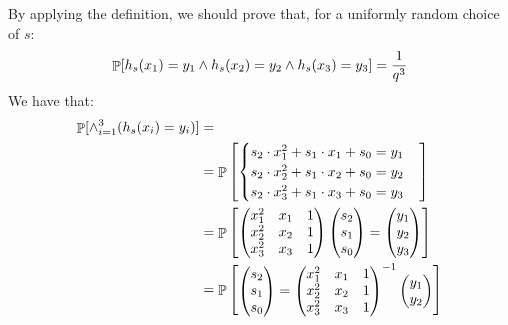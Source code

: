 \begin{enumerate}[(a)]
\begin{enumerate}[(i)]
		\begin{solution}		
			By applying the definition, we should prove that, for a uniformly random choice of $s$:
			\[ \mathop{\mathbb P}[h_s(x_1) = y_1 \wedge h_s(x_2) = y_2 \wedge h_s(x_3) = y_3] = \frac{1}{q^3} \]
			We have that:
			\begin{align*}
				\mathop{\mathbb P}[\wedge_{i=1}^3 (h_s(x_i) = y_i)] &= \\
				&=\mathop{\mathbb P}\begin{bmatrix}
						\begin{cases}
							s_2\cdot x_1^2 + s_1\cdot x_1 + s_0 = y_1 \\
							s_2\cdot x_2^2 + s_1\cdot x_2 + s_0 = y_2 \\
							s_2\cdot x_3^2 + s_1\cdot x_3 + s_0 = y_3
						\end{cases}
					\end{bmatrix} \\
				&= \mathop{\mathbb P}\begin{bmatrix}
					 	\begin{pmatrix}
							x_1^2 & x_1 & 1 \\
							x_2^2 & x_2 & 1 \\
							x_3^2 & x_3 & 1
						\end{pmatrix}
						\begin{pmatrix}
							s_2 \\
							s_1 \\
							s_0
						\end{pmatrix}
						=
						\begin{pmatrix}
							y_1 \\
							y_2 \\
							y_3
						\end{pmatrix}
					\end{bmatrix} \\
				&= \mathop{\mathbb P}\begin{bmatrix}
					 	\begin{pmatrix}
							s_2 \\
							s_1 \\
							s_0
						\end{pmatrix}
						=
						\begin{pmatrix}
							x_1^2 & x_1 & 1 \\
							x_2^2 & x_2 & 1 \\
							x_3^2 & x_3 & 1
						\end{pmatrix}^{-1}
						\begin{pmatrix}
							y_1 \\
							y_2 \\

\end{pmatrix}
\end{bmatrix}
\end{align*}
\end{solution}
\end{enumerate}
\end{enumerate}
